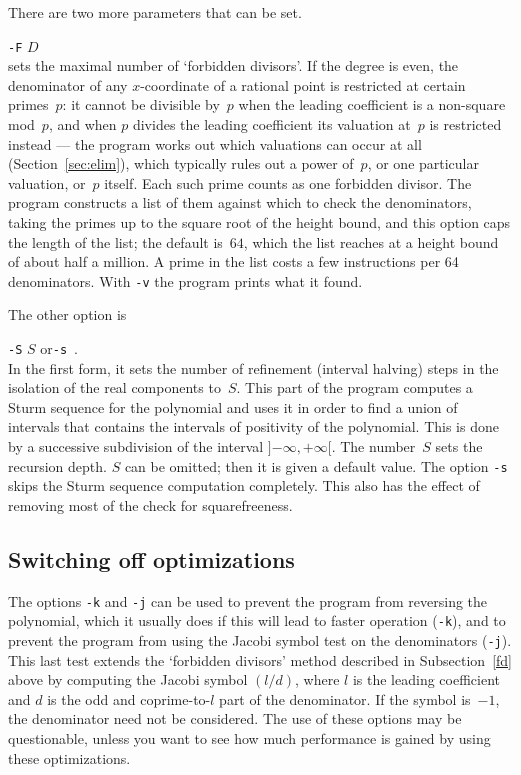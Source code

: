 \documentclass[12pt,a4paper,oneside]{amsart}
\begin{document}
There are two more parameters that can be set. \\
\strut\quad\verb+-F+ $D$ \\
sets the maximal number of `forbidden divisors'. If the degree is even,
the denominator of any $x$-coordinate of a rational point is restricted at
certain primes~$p$: it cannot be divisible by~$p$ when the leading
coefficient is a non-square mod~$p$, and when $p$ divides the leading
coefficient its valuation at~$p$ is restricted instead --- the program
works out which valuations can occur at all (Section~\ref{sec:elim}), which
typically rules out a power of~$p$, or one particular valuation, or~$p$
itself. Each such prime counts as one forbidden divisor. The program
constructs a list of them against which to check the denominators, taking
the primes up to the square root of the height bound, and this option caps
the length of the list; the default is~$64$, which the list reaches at a
height bound of about half a million. A prime in the list costs a few
instructions per 64 denominators. With \verb+-v+ the program prints what it found.

The other option is \\
\strut\quad\verb+-S+ $S$ \quad or\quad \verb+-s+ \,. \\
In the first form, it sets the number of refinement (interval halving)
steps in the isolation of the real components to~$S$. This part of the
program computes a Sturm sequence for the polynomial and uses it in order
to find a union of intervals that contains the intervals of positivity
of the polynomial. This is done by a successive subdivision of the
interval $]{-\infty}, +\infty[$. The number~$S$ sets the recursion depth.
$S$ can be omitted; then it is given a default value. The option
\verb+-s+ skips the Sturm sequence computation completely. This also has
the effect of removing most of the check for squarefreeness.

\subsection{Switching off optimizations}

The options \verb+-k+ and \verb+-j+ can be used to prevent the program
from reversing the polynomial, which it usually does if this will lead
to faster operation (\verb+-k+), and to prevent the program from using
the Jacobi symbol test on the denominators (\verb+-j+). This last test
extends the `forbidden divisors' method described in
Subsection~\ref{fd} above by computing the Jacobi symbol $(l/d)$, where
$l$ is the leading coefficient and $d$ is the odd and coprime-to-$l$
part of the denominator. If the symbol is~$-1$, the denominator need not
be considered. The use of these options may be questionable, unless you
want to see how much performance is gained by using these optimizations.
\end{document}
